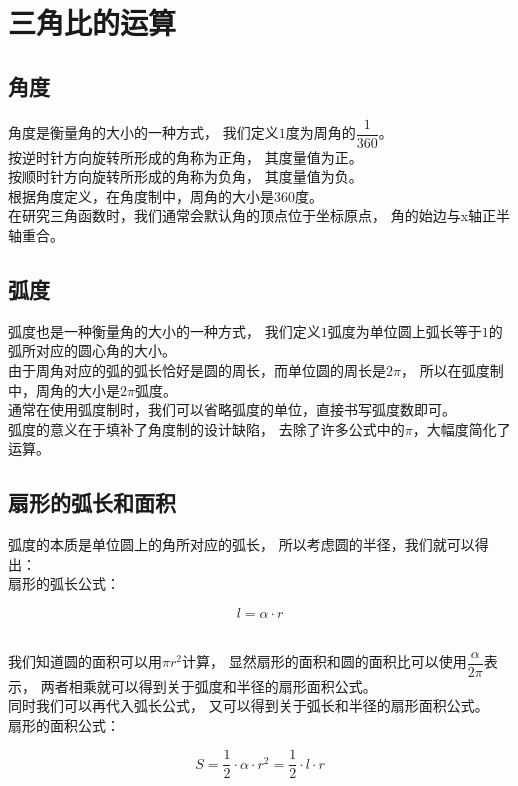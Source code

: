 \documentclass[UTF8]{ctexart}
\begin{document}
\newpage

\section{三角比的运算}

\subsection{角度}
    角度是衡量角的大小的一种方式，
    我们定义$1$度为周角的$\dfrac{1}{360}$。\\[3mm]
    按逆时针方向旋转所形成的角称为正角，
    其度量值为正。\\
    按顺时针方向旋转所形成的角称为负角，
    其度量值为负。\\[3mm]
    根据角度定义，在角度制中，周角的大小是$360$度。\\[3mm]
    在研究三角函数时，我们通常会默认角的顶点位于坐标原点，
    角的始边与x轴正半轴重合。

\subsection{弧度}
    弧度也是一种衡量角的大小的一种方式，
    我们定义$1$弧度为单位圆上弧长等于$1$的弧所对应的圆心角的大小。\\[3mm]
    由于周角对应的弧的弧长恰好是圆的周长，而单位圆的周长是$2\pi$，
    所以在弧度制中，周角的大小是$2\pi$弧度。\\[3mm]
    通常在使用弧度制时，我们可以省略弧度的单位，直接书写弧度数即可。\\[3mm]
    弧度的意义在于填补了角度制的设计缺陷，
    去除了许多公式中的$\pi$，大幅度简化了运算。

\subsection{扇形的弧长和面积}
    弧度的本质是单位圆上的角所对应的弧长，
    所以考虑圆的半径，我们就可以得出：\\[3mm]
    扇形的弧长公式：
    \begin{large}
    \begin{equation*}
        l=\alpha \cdot r    
    \end{equation*}   
    \end{large}\\[3mm]
    我们知道圆的面积可以用$\pi r^2$计算，
    显然扇形的面积和圆的面积比可以使用$\dfrac{\alpha}{2\pi}$表示，
    两者相乘就可以得到关于弧度和半径的扇形面积公式。\\[3mm]
    同时我们可以再代入弧长公式，
    又可以得到关于弧长和半径的扇形面积公式。\\[3mm]
    扇形的面积公式：
    \begin{large}
    \begin{equation*}
        S=\frac{1}{2}\cdot \alpha \cdot r^2=\frac{1}{2}\cdot l \cdot r
    \end{equation*}   
    \end{large}\\[3mm]
\end{document}
